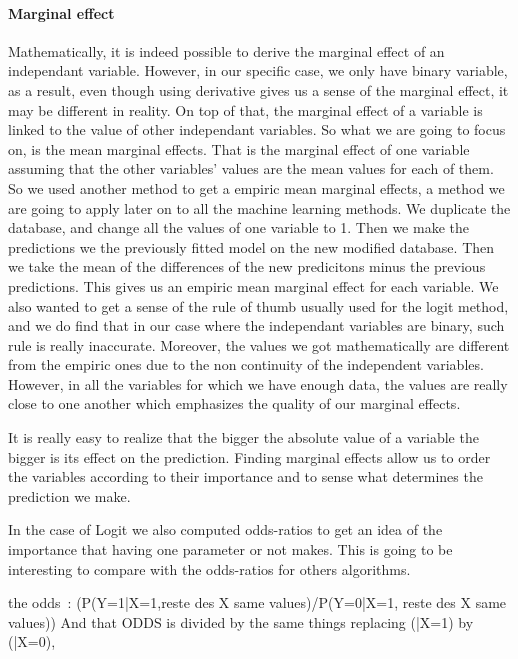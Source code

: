 \paragraph{Marginal effect}
Mathematically, it is indeed possible to derive the marginal effect of an independant variable. However, in our specific case, we only have binary variable, as a result, even though using derivative gives us a sense of the marginal effect, it may be different in reality. On top of that, the marginal effect of a variable is linked to the value of other independant variables. So what we are going to focus on, is the mean marginal effects. That is the marginal effect of one variable assuming that the other variables’ values are the mean values for each of them.
So we used another method to get a empiric mean marginal effects, a method we are going to apply later on to all the machine learning methods. We duplicate the database, and change all the values of one variable to 1. Then we make the predictions we the previously fitted model on the new modified database. Then we take the mean of the differences of the new predicitons minus the previous predictions. This gives us an empiric mean marginal effect for each variable.
We also wanted to get a sense of the rule of thumb usually used for the logit method, and we do find that in our case where the independant variables are binary, such rule is really inaccurate. Moreover, the values we got mathematically are different from the empiric ones due to the non continuity of the independent variables. However, in all the variables for which we have enough data, the values are really close to one another which emphasizes the quality of our marginal effects.


It is really easy to realize that the bigger the absolute value of a variable the bigger is its effect on the prediction.
Finding marginal effects allow us to order the variables according to their importance and to sense what determines the prediction we make.

In the case of Logit we also computed odds-ratios to get an idea of the importance that having one parameter or not makes. This is going to be interesting to compare with the odds-ratios for others algorithms.


the odds :
(P(Y=1|X=1,reste des X same values)/P(Y=0|X=1, reste des X same values))
And that ODDS is divided by the same things replacing (|X=1) by (|X=0),

